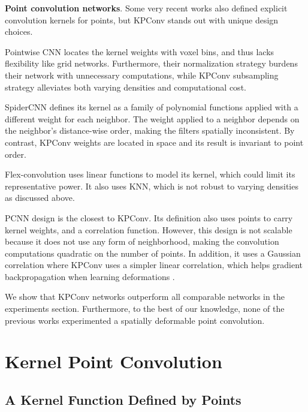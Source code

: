 \documentclass[10pt,twocolumn,letterpaper]{article}
\begin{document}
\noindent
\textbf{Point convolution networks}. Some very recent works also defined explicit convolution kernels for points, but KPConv stands out with unique design choices.

Pointwise CNN \cite{hua2018pointwise} locates the kernel weights with voxel bins, and thus lacks flexibility like grid networks. Furthermore, their normalization strategy burdens their network with unnecessary computations, while KPConv subsampling strategy alleviates both varying densities and computational cost.

SpiderCNN \cite{xu2018spidercnn} defines its kernel as a family of polynomial functions applied with a different weight for each neighbor. The weight applied to a neighbor depends on the neighbor's distance-wise order, making the filters spatially inconsistent. By contrast, KPConv weights are located in space and its result is invariant to point order.

Flex-convolution \cite{groh2018flex} uses linear functions to model its kernel, which could limit its representative power. It also uses KNN, which is not robust to varying densities as discussed above.

PCNN \cite{atzmon2018point} design is the closest to KPConv. Its definition also uses points to carry kernel weights, and a correlation function. However, this design is not scalable because it does not use any form of neighborhood, making the convolution computations quadratic on the number of points. In addition, it uses a Gaussian correlation where KPConv uses a simpler linear correlation, which helps gradient backpropagation when learning deformations \cite{dai2017deformable}.

We show that KPConv networks outperform all comparable networks in the experiments section. Furthermore, to the best of our knowledge, none of the previous works experimented a spatially deformable point convolution.

\section{Kernel Point Convolution}

\subsection{A Kernel Function Defined by Points}
\end{document}
